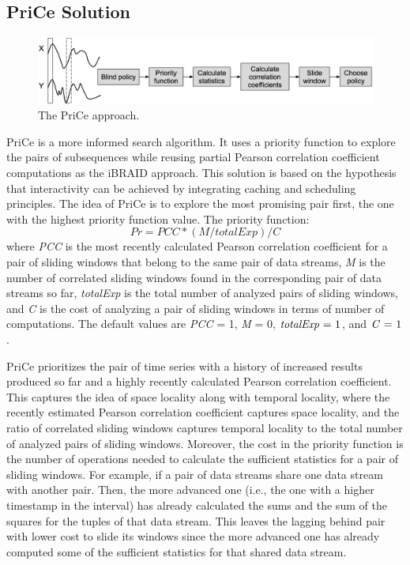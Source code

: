 \subsection{PriCe Solution~\cite{ref1,ref4}}
\begin{figure}[ht]
\centering
    \includegraphics[width=\textwidth]{figures/price.png}
    \caption{The PriCe approach.}
    \label{fig:PriCe}
\end{figure}
PriCe is a more informed search algorithm. It uses a priority function to explore the pairs of subsequences while reusing partial Pearson correlation coefficient computations as the iBRAID approach. This solution is based on the hypothesis that interactivity can be achieved by integrating caching and scheduling principles. The idea of PriCe is to explore the most promising pair first, the one with the highest priority function value. The priority function:
\begin{equation}
P r=P C C *(M / t o t a l E x p) / C
\end{equation}
where \textit{PCC} is the most recently calculated Pearson correlation coefficient for a pair of sliding windows that belong to the same pair of data streams, \textit{M} is the number of correlated sliding windows found in the corresponding pair of data streams so far, \textit{totalExp} is the total number of analyzed pairs of sliding windows, and \textit{C} is the cost of analyzing a pair of sliding windows in terms of number of computations. The default values are \textit{PCC} = 1, \textit{M} = 0, $\mbox{\textit{totalExp} = 1}$, and $\mbox{\textit{C} = 1}$.\newline

PriCe prioritizes the pair of time series with a history of increased results produced so far and a highly recently calculated Pearson correlation coefficient. This captures the idea of space locality along with temporal locality, where the recently estimated Pearson correlation coefficient captures space locality, and the ratio of correlated sliding windows captures temporal locality to the total number of analyzed pairs of sliding windows. Moreover, the cost in the priority function is the number of operations needed to calculate the sufficient statistics for a pair of sliding windows. For example, if a pair of data streams share one data stream with another pair. Then, the more advanced one (i.e., the one with a higher timestamp in the interval) has already calculated the sums and the sum of the squares for the tuples of that data stream. This leaves the lagging behind pair with lower cost to slide its windows since the more advanced one has already computed some of the sufficient statistics for that shared data stream.\newline

